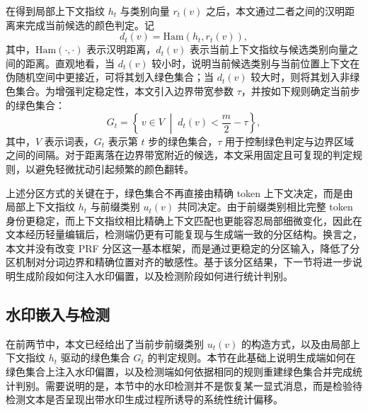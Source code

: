在得到局部上下文指纹 $h_t$ 与类别向量 $r_t(v)$ 之后，本文通过二者之间的汉明距离来完成当前候选的颜色判定。记
\begin{equation}
d_t(v)=\mathrm{Ham}\!\left(h_t, r_t(v)\right),
\label{eq:hamming_distance}
\end{equation}
其中，$\mathrm{Ham}(\cdot,\cdot)$ 表示汉明距离，$d_t(v)$ 表示当前上下文指纹与候选类别向量之间的距离。直观地看，当 $d_t(v)$ 较小时，说明当前候选类别与当前位置上下文在伪随机空间中更接近，可将其划入绿色集合；当 $d_t(v)$ 较大时，则将其划入非绿色集合。为增强判定稳定性，本文引入边界带宽参数 $\tau$，并按如下规则确定当前步的绿色集合：
\begin{equation}
G_t=\left\{\, v\in V \;\middle|\; d_t(v)<\frac{m}{2}-\tau \right\},
\label{eq:green_set}
\end{equation}
其中，$V$ 表示词表，$G_t$ 表示第 $t$ 步的绿色集合，$\tau$ 用于控制绿色判定与边界区域之间的间隔。对于距离落在边界带宽附近的候选，本文采用固定且可复现的判定规则，以避免轻微扰动引起频繁的颜色翻转。

上述分区方式的关键在于，绿色集合不再直接由精确 token 上下文决定，而是由局部上下文指纹 $h_t$ 与前缀类别 $u_t(v)$ 共同决定。由于前缀类别相比完整 token 身份更稳定，而上下文指纹相比精确上下文匹配也更能容忍局部细微变化，因此在文本经历轻量编辑后，检测端仍更有可能复现与生成端一致的分区结构。换言之，本文并没有改变 PRF 分区这一基本框架，而是通过更稳定的分区输入，降低了分区机制对分词边界和精确位置对齐的敏感性。基于该分区结果，下一节将进一步说明生成阶段如何注入水印偏置，以及检测阶段如何进行统计判别。

\subsection{水印嵌入与检测}

在前两节中，本文已经给出了当前步前缀类别 $u_t(v)$ 的构造方式，以及由局部上下文指纹 $h_t$ 驱动的绿色集合 $G_t$ 的判定规则。本节在此基础上说明生成端如何在绿色集合上注入水印偏置，以及检测端如何依据相同的规则重建绿色集合并完成统计判别。需要说明的是，本节中的水印检测并不是恢复某一显式消息，而是检验待检测文本是否呈现出带水印生成过程所诱导的系统性统计偏移。

